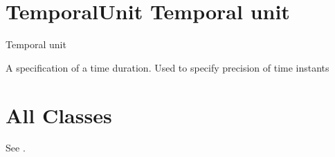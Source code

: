 \documentclass[letterpaper,10pt,english]{sphinxmanual}
\begin{document}
\section{TemporalUnit \sphinxhyphen{} Temporal unit}
\label{\detokenize{doc-TemporalUnit:temporalunit-temporal-unit}}\label{\detokenize{doc-TemporalUnit:index-0}}\label{\detokenize{doc-TemporalUnit::doc}}
\begin{sphinxShadowBox}

\sphinxAtStartPar
Temporal unit
\end{sphinxShadowBox}

\begin{sphinxShadowBox}

\sphinxAtStartPar
A specification of a time duration.  Used to specify precision of time instants
\end{sphinxShadowBox}

\begin{sphinxShadowBox}

\sphinxAtStartPar
{}
\end{sphinxShadowBox}


\section{All Classes}
\label{\detokenize{classes:all-classes}}
\sphinxAtStartPar
See {\hyperref[\detokenize{classes:table-5}]{}}.
\end{document}
